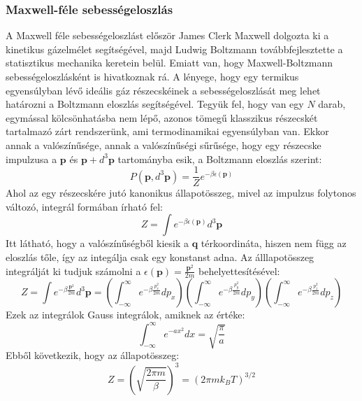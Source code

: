 \documentclass[../main.tex]{subfiles}
\begin{document}
\subsubsection{Maxwell-féle sebességeloszlás\cite{therm_stat}}
A Maxwell féle sebességeloszlást először James Clerk Maxwell dolgozta ki a kinetikus gázelmélet segítségével, majd Ludwig Boltzmann továbbfejlesztette a statisztikus mechanika keretein belül. 
Emiatt van, hogy Maxwell-Boltzmann sebességeloszlásként is hivatkoznak rá. A lényege, hogy egy termikus egyensúlyban lévő ideális gáz részecskéinek a sebességeloszlását meg lehet határozni a Boltzmann eloszlás
segítségével. Tegyük fel, hogy van egy $N$ darab, egymással kölcsönhatásba nem lépő, azonos tömegű klasszikus részecskét tartalmazó zárt rendszerünk, ami termodinamikai egyensúlyban van.
Ekkor annak a valószínűsége, annak a valószínűségi sűrűsége, hogy egy részecske impulzusa a $\mathbf{p}$ és $\mathbf{p} + d^3 \mathbf{p}$ tartományba esik, a Boltzmann eloszlás szerint:
\begin{equation}
    P(\mathbf{p}, d^3 \mathbf{p}) = \frac{1}{Z} e^{-\beta \epsilon(\mathbf{p})}
\end{equation}
Ahol az egy részecskére jutó kanonikus állapotösszeg, mivel az impulzus folytonos változó, integrál formában írható fel:
\begin{equation}
    Z = \int e^{-\beta \epsilon(\mathbf{p})} d^3 \mathbf{p}
\end{equation}
Itt látható, hogy a valószínűségből kiesik a $\mathbf{q}$ térkoordináta, hiszen nem függ az eloszlás tőle, így az integálja csak egy konstanst adna.
Az álllapotösszeg integrálját ki tudjuk számolni a $\epsilon(\mathbf{p}) = \frac{\mathbf{p}^2}{2m}$ behelyettesítésével:
\begin{equation}
    Z = \int e^{-\beta \frac{\mathbf{p}^2}{2m}} d^3 \mathbf{p} = \left( \int_{-\infty}^{\infty} e^{-\beta \frac{p_x^2}{2m}} dp_x \right) \left( \int_{-\infty}^{\infty} e^{-\beta \frac{p_y^2}{2m}} dp_y \right) \left( \int_{-\infty}^{\infty} e^{-\beta \frac{p_z^2}{2m}} dp_z \right)
\end{equation}
Ezek az integrálok Gauss integrálok, amiknek az értéke:
\begin{equation}
    \int_{-\infty}^{\infty} e^{-a x^2} dx = \sqrt{\frac{\pi}{a}}
\end{equation}
Ebből következik, hogy az állapotösszeg:
\begin{equation}
    Z = \left( \sqrt{\frac{2 \pi m}{\beta}} \right)^3 = \left( 2 \pi m k_B T \right)^{3/2}
\end{equation}
\end{document}
